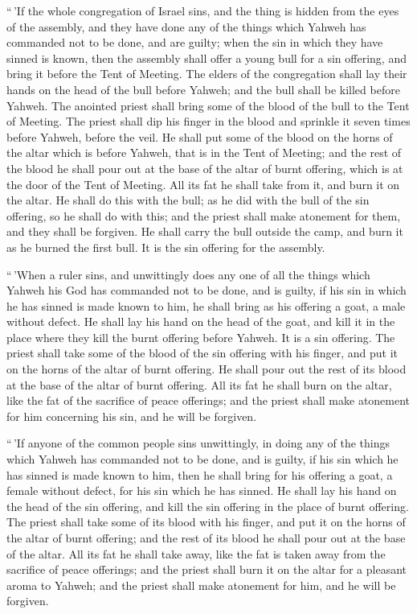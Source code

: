  ``\,'If the whole congregation of Israel sins, and the
thing is hidden from the eyes of the assembly, and they have done any of
the things which Yahweh has commanded not to be done, and are guilty;
 when the sin in which they have sinned is known, then
the assembly shall offer a young bull for a sin offering, and bring it
before the Tent of Meeting.  The elders of the
congregation shall lay their hands on the head of the bull before
Yahweh; and the bull shall be killed before Yahweh.  The
anointed priest shall bring some of the blood of the bull to the Tent of
Meeting.  The priest shall dip his finger in the blood
and sprinkle it seven times before Yahweh, before the veil.
 He shall put some of the blood on the horns of the altar
which is before Yahweh, that is in the Tent of Meeting; and the rest of
the blood he shall pour out at the base of the altar of burnt offering,
which is at the door of the Tent of Meeting.  All its fat
he shall take from it, and burn it on the altar.  He
shall do this with the bull; as he did with the bull of the sin
offering, so he shall do with this; and the priest shall make atonement
for them, and they shall be forgiven.  He shall carry the
bull outside the camp, and burn it as he burned the first bull. It is
the sin offering for the assembly.

 ``\,'When a ruler sins, and unwittingly does any one of
all the things which Yahweh his God has commanded not to be done, and is
guilty,  if his sin in which he has sinned is made known
to him, he shall bring as his offering a goat, a male without defect.
 He shall lay his hand on the head of the goat, and kill
it in the place where they kill the burnt offering before Yahweh. It is
a sin offering.  The priest shall take some of the blood
of the sin offering with his finger, and put it on the horns of the
altar of burnt offering. He shall pour out the rest of its blood at the
base of the altar of burnt offering.  All its fat he
shall burn on the altar, like the fat of the sacrifice of peace
offerings; and the priest shall make atonement for him concerning his
sin, and he will be forgiven.

 ``\,'If anyone of the common people sins unwittingly, in
doing any of the things which Yahweh has commanded not to be done, and
is guilty,  if his sin which he has sinned is made known
to him, then he shall bring for his offering a goat, a female without
defect, for his sin which he has sinned.  He shall lay
his hand on the head of the sin offering, and kill the sin offering in
the place of burnt offering.  The priest shall take some
of its blood with his finger, and put it on the horns of the altar of
burnt offering; and the rest of its blood he shall pour out at the base
of the altar.  All its fat he shall take away, like the
fat is taken away from the sacrifice of peace offerings; and the priest
shall burn it on the altar for a pleasant aroma to Yahweh; and the
priest shall make atonement for him, and he will be forgiven.

